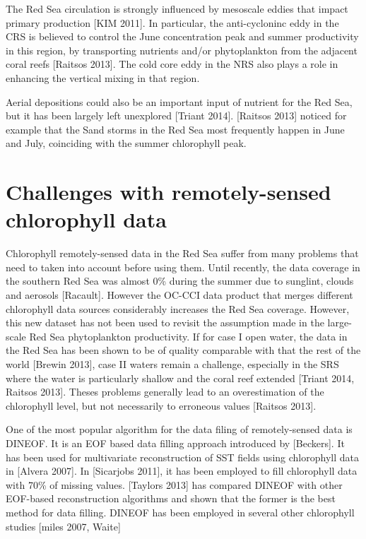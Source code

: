 The Red Sea circulation is strongly influenced by mesoscale eddies that impact primary production [KIM 2011].  In particular, the anti-cycloninc eddy in the CRS is believed to control the June concentration peak and summer productivity in this region, by transporting nutrients and/or phytoplankton from the adjacent coral reefs [Raitsos 2013]. The cold core eddy in the NRS also plays a role in enhancing the vertical mixing in that region.

Aerial depositions could also be an important input of nutrient for the Red Sea, but it has been largely left unexplored [Triant 2014]. [Raitsos 2013] noticed for example that the Sand storms in the Red Sea most frequently happen in June and July, coinciding with the summer chlorophyll peak. 

\section{Challenges with remotely-sensed chlorophyll data}

Chlorophyll remotely-sensed data in the Red Sea suffer from many problems that need to taken into account before using them. Until recently, the data coverage in the southern Red Sea was almost 0\% during the summer due to sunglint, clouds and aerosols [Racault]. However the OC-CCI data product that merges different chlorophyll data sources considerably increases the Red Sea coverage. However, this new dataset has not been used to revisit the assumption made in the large-scale Red Sea phytoplankton productivity. If for case I open water, the data in the Red Sea has been shown to be of quality comparable with  that the rest of the world [Brewin 2013], case II waters remain a challenge, especially in the SRS where the water is particularly shallow and the coral reef extended [Triant 2014, Raitsos 2013]. Theses problems generally lead to an overestimation of the chlorophyll level, but not necessarily to erroneous values [Raitsos 2013].

One of the most popular algorithm for the data filing of remotely-sensed data is DINEOF. It is an EOF based data filling approach introduced by [Beckers]. It has been used for multivariate reconstruction of SST fields using chlorophyll data in [Alvera 2007]. In [Sicarjobs 2011], it has been employed to fill chlorophyll data with 70\% of missing values. [Taylors 2013] has compared DINEOF with other EOF-based reconstruction algorithms and shown that the former is the best method for data filling. DINEOF has been employed in several other chlorophyll studies [miles 2007, Waite]

